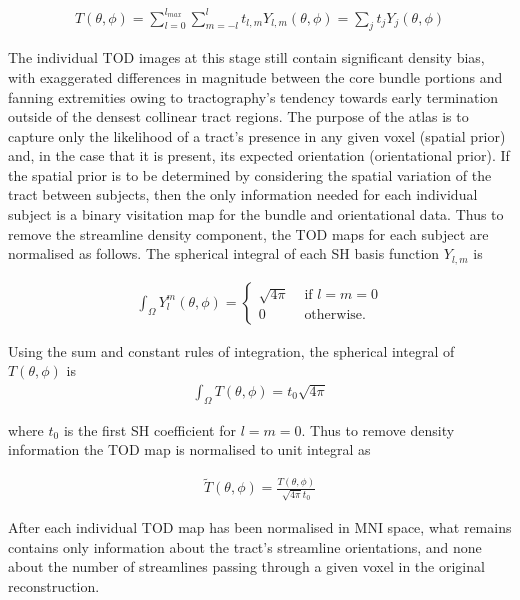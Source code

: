 \begin{align}
  T(\theta, \phi) = \sum_{l=0}^{l_{max}} \sum_{m=-l}^l t_{l,m} Y_{l,m}(\theta, \phi) = \sum_j t_jY_j(\theta, \phi)
\end{align}

The individual TOD images at this stage still contain significant density bias, with exaggerated differences in magnitude between the core bundle portions and fanning extremities owing to tractography's tendency towards early termination outside of the densest collinear tract regions.\autocite{Rheault2020,Smith2013}
The purpose of the atlas is to capture only the likelihood of a tract's presence in any given voxel (spatial prior) and, in the case that it is present, its expected orientation (orientational prior).
If the spatial prior is to be determined by considering the spatial variation of the tract between subjects, then the only information needed for each individual subject is a binary visitation map for the bundle and orientational data.
Thus to remove the streamline density component, the TOD maps for each subject are normalised as follows.
The spherical integral of each SH basis function $Y_{l,m}$ is

\begin{align}
  \int_{\Omega} Y^m_l(\theta, \phi) = \begin{cases}
   \sqrt{4\pi} & \text{ if } l=m=0\\
   0 & \text{ otherwise. }
  \end{cases}
\end{align}

Using the sum and constant rules of integration, the spherical integral of $T(\theta,\phi)$ is
\begin{align}
  \int_{\Omega} T(\theta,\phi) = t_0 \sqrt{4\pi}
\end{align}

where $t_0$ is the first SH coefficient for $l=m=0$. Thus to remove density information the TOD map is normalised to unit integral as

\begin{align}
  \widetilde{T}(\theta, \phi) = \frac{T(\theta,\phi)}{\sqrt{4\pi} t_0}
\end{align}

After each individual TOD map has been normalised in MNI space, what remains contains only information about the tract's streamline orientations, and none about the number of streamlines passing through a given voxel in the original reconstruction.

